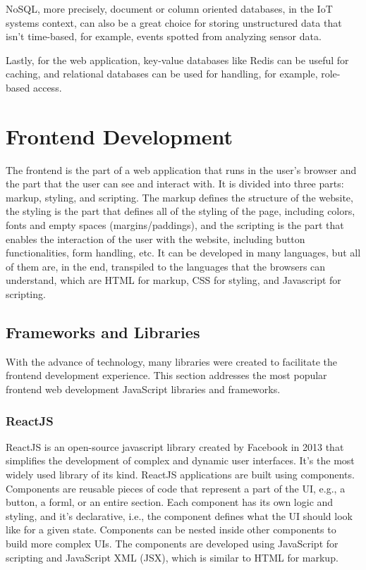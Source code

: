 \gls{NoSQL}, more precisely, document or column oriented databases, in the \gls{IoT} systems
context, can also be a great choice for storing unstructured data that isn't
time-based, for example, events spotted from analyzing sensor data.

Lastly, for the web application, key-value databases like Redis can be useful
for caching, and relational databases can be used for handling, for example,
role-based access.

\section{Frontend Development}
The frontend is the part of a web application that runs in the user's browser and
the part that the user can see and interact with. It is divided into three
parts: markup, styling, and scripting.
The markup defines the structure of the website, the styling is the part that
defines all of the styling of the page, including colors, fonts and empty spaces
(margins/paddings), and the scripting is the part that enables the interaction
of the user with the website, including button functionalities, form handling,
etc.
It can be developed in many languages, but all of them are, in the end, transpiled
to the languages that the browsers can understand, which are \gls{HTML} for
markup, \gls{CSS} for styling, and Javascript for scripting.

\subsection{Frameworks and Libraries}
With the advance of technology, many libraries were created to facilitate the
frontend development experience. This section addresses the most popular
frontend web development JavaScript libraries and frameworks.
\subsubsection{ReactJS}
ReactJS is an open-source javascript library created by Facebook in 2013 that
simplifies the development of complex and dynamic user interfaces. It's the most widely
used library of its kind.
ReactJS applications are built using components. Components are reusable pieces of
code that represent a part of the \gls{UI}, e.g., a button, a forml, or an entire section.
Each component has its own logic and styling, and it's declarative, i.e., the
component defines what the \gls{UI} should look like for a given state.
Components can be nested inside other components to build more complex \gls{UI}s.
The components are developed using JavaScript for scripting and JavaScript \gls{XML} (\gls{JSX}),
which is similar to \gls{HTML} for markup.

